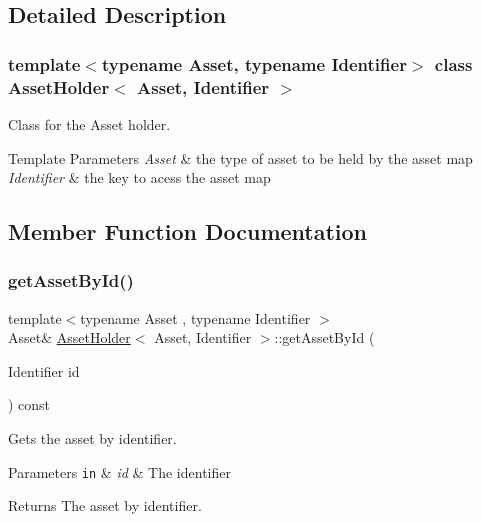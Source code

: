 \subsection{Detailed Description}
\subsubsection*{template$<$typename Asset, typename Identifier$>$\newline
class Asset\+Holder$<$ Asset, Identifier $>$}

Class for the Asset holder. 


\begin{DoxyTemplParams}{Template Parameters}
{\em Asset} & the type of asset to be held by the asset map \\
\hline
{\em Identifier} & the key to acess the asset map \\
\hline
\end{DoxyTemplParams}


\subsection{Member Function Documentation}
\mbox{\label{classAssetHolder_abb7126c438d6f72a0eec983a98c272a9}} 
\subsubsection{\texorpdfstring{get\+Asset\+By\+Id()}{getAssetById()}}
{\footnotesize\ttfamily template$<$typename Asset , typename Identifier $>$ \\
Asset\& \mbox{\hyperlink{classAssetHolder}{Asset\+Holder}}$<$ Asset, Identifier $>$\+::get\+Asset\+By\+Id (\begin{DoxyParamCaption}\item[{Identifier}]{id }\end{DoxyParamCaption}) const}



Gets the asset by identifier. 


\begin{DoxyParams}[1]{Parameters}
\mbox{\tt in}  & {\em id} & The identifier\\
\hline
\end{DoxyParams}
\begin{DoxyReturn}{Returns}
The asset by identifier. 
\end{DoxyReturn}
\mbox{\label{classAssetHolder_ae7d64002db05c07fa914d5fa902a98ee}} 
